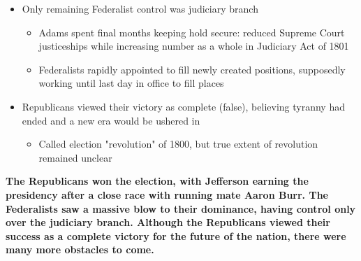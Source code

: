 \documentclass[a4paper]{article}
\begin{document}
{\begin{itemize}
        \item Only remaining Federalist control was judiciary branch
        \begin{itemize}
            \item Adams spent final months keeping hold secure: reduced Supreme Court justiceships while increasing number as a whole in Judiciary Act of 1801
            \item Federalists rapidly appointed to fill newly created positions, supposedly working until last day in office to fill places
        \end{itemize}
        \item Republicans viewed their victory as complete (false), believing tyranny had ended and a new era would be ushered in 
        \begin{itemize}
            \item Called election "revolution" of 1800, but true extent of revolution remained unclear
        \end{itemize}
    \end{itemize}
    \textbf{The Republicans won the election, with Jefferson earning the presidency after a close race with running mate Aaron Burr. The Federalists saw a massive blow to their dominance, having control only over the judiciary branch. Although the Republicans viewed their success as a complete victory for the future of the nation, there were many more obstacles to come.}}
    
\end{document}
